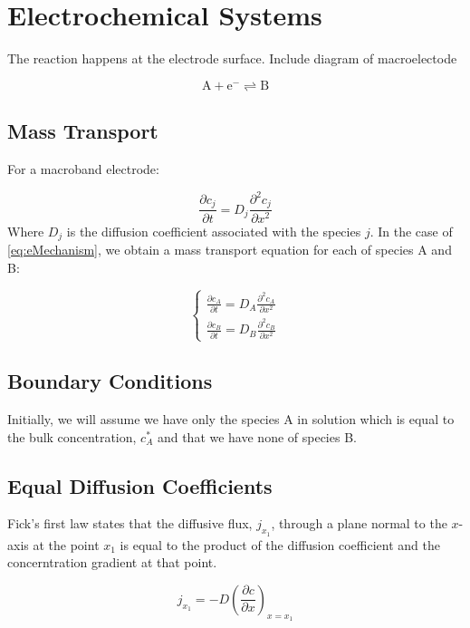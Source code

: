 \chapter{Electrochemical Systems}\label{eq:electrochemistry}

The reaction happens at the electrode surface.
Include diagram of macroelectode

\begin{equation}\label{eq:eMechanism}
  \mathrm{A} + \mathrm{e}^{-} \rightleftharpoons \mathrm{B}
\end{equation}

\section{Mass Transport}

For a macroband electrode:

\begin{equation}
  \frac{\partial c_j}{\partial t} = D_j \frac{\partial^2 c_j}{\partial x^2}
  \label{eq:masstransport_macroband}
\end{equation}
Where $D_j$ is the diffusion coefficient associated with the species
$j$. In the case of \autoref{eq:eMechanism}, we obtain a mass transport
equation for each of species A and B:

$$
\begin{cases}
  \frac{\partial c_A}{\partial t} = D_A \frac{\partial^2 c_A}{\partial x^2} \\
  \frac{\partial c_B}{\partial t} = D_B \frac{\partial^2 c_B}{\partial x^2}
\end{cases}
$$
\section{Boundary Conditions}
Initially, we will assume we have only the species A in solution
which is equal to the bulk concentration, $c_A^*$ and that we have
none of species B.

\section{Equal Diffusion Coefficients}

Fick's first law states that the diffusive flux, $j_{x_1}$, through a
plane normal to the $x$-axis at the point $x_1$ is equal to the
product of the diffusion coefficient and the concerntration gradient
at that point.

\begin{equation}
  j_{x_1} = -D \left( \frac{\partial c}{\partial x} \right)_{x=x_1}
\end{equation}

